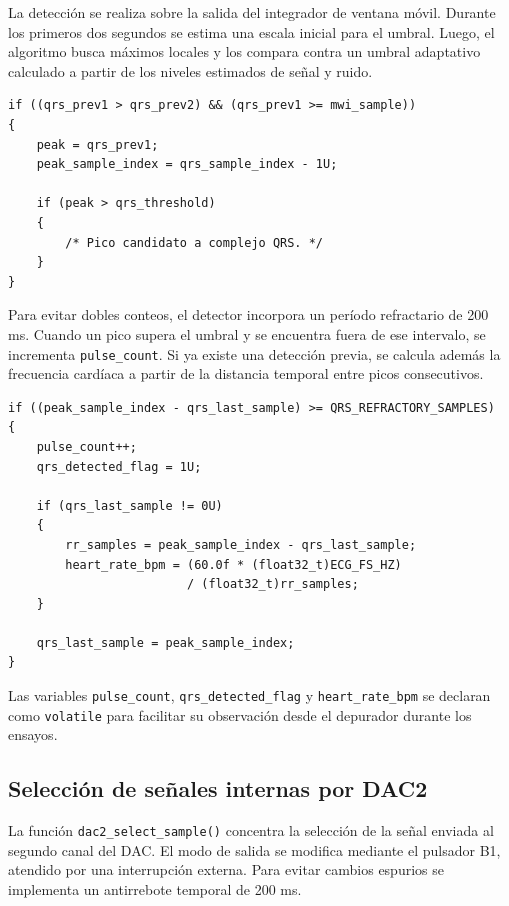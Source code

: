 \documentclass[12pt]{article}
\begin{document}
		La detección se realiza sobre la salida del integrador de ventana móvil. Durante los primeros dos segundos se estima una escala inicial para el umbral. Luego, el algoritmo busca máximos locales y los compara contra un umbral adaptativo calculado a partir de los niveles estimados de señal y ruido.

		\begin{lstlisting}[style=mystyle, caption={Criterio básico de detección de máximo local.}]
if ((qrs_prev1 > qrs_prev2) && (qrs_prev1 >= mwi_sample))
{
    peak = qrs_prev1;
    peak_sample_index = qrs_sample_index - 1U;

    if (peak > qrs_threshold)
    {
        /* Pico candidato a complejo QRS. */
    }
}
		\end{lstlisting}

		Para evitar dobles conteos, el detector incorpora un período refractario de 200 ms. Cuando un pico supera el umbral y se encuentra fuera de ese intervalo, se incrementa \texttt{pulse\_count}. Si ya existe una detección previa, se calcula además la frecuencia cardíaca a partir de la distancia temporal entre picos consecutivos.

		\begin{lstlisting}[style=mystyle, caption={Actualización del conteo y frecuencia cardíaca.}]
if ((peak_sample_index - qrs_last_sample) >= QRS_REFRACTORY_SAMPLES)
{
    pulse_count++;
    qrs_detected_flag = 1U;

    if (qrs_last_sample != 0U)
    {
        rr_samples = peak_sample_index - qrs_last_sample;
        heart_rate_bpm = (60.0f * (float32_t)ECG_FS_HZ)
                         / (float32_t)rr_samples;
    }

    qrs_last_sample = peak_sample_index;
}
		\end{lstlisting}

		Las variables \texttt{pulse\_count}, \texttt{qrs\_detected\_flag} y \texttt{heart\_rate\_bpm} se declaran como \texttt{volatile} para facilitar su observación desde el depurador durante los ensayos.

		\subsection{Selección de señales internas por DAC2}

		La función \texttt{dac2\_select\_sample()} concentra la selección de la señal enviada al segundo canal del DAC. El modo de salida se modifica mediante el pulsador B1, atendido por una interrupción externa. Para evitar cambios espurios se implementa un antirrebote temporal de 200 ms.
\end{document}

